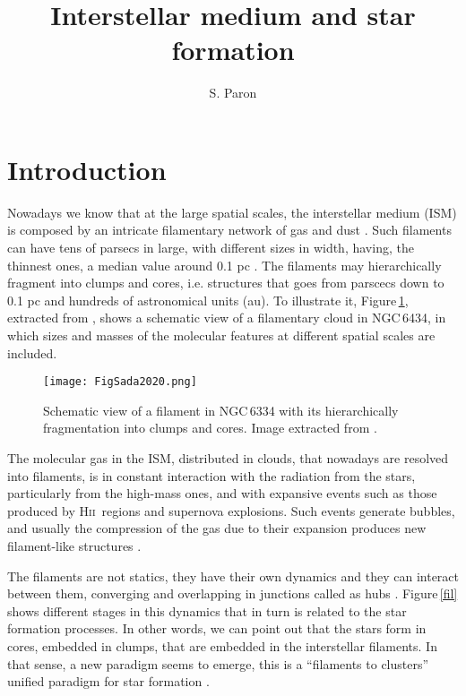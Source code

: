 \documentclass[baaa]{baaa}
\title{Interstellar medium and star formation}
\author{S. Paron\inst{1}
}
\institute{
Instituto de Astronomía y Física del Espacio, CONICET--UBA, Argentina
}
\newcommand{\hii}{H\textsc{ii}}
\begin{document}
\maketitle

\section{Introduction}

Nowadays we know that at the large spatial scales, the interstellar medium (ISM) is composed by an intricate filamentary network of gas and dust \citep{andre14,pineda23}. Such filaments can have tens of parsecs in large, with different sizes in width, having, the thinnest ones, a median value around 0.1 pc \citep{arzou19}. The filaments may hierarchically fragment into clumps and cores, i.e. structures that goes from parscecs down to 0.1 pc and hundreds of astronomical units (au). To illustrate it, Figure\,\ref{hier}, extracted from \citet{sada20}, shows a schematic view of a filamentary cloud in NGC\,6434, in which sizes and masses of the molecular features at different spatial scales are included.  

\begin{figure}[h!]
\centering
\texttt{[image: FigSada2020.png]}
\caption{Schematic view of a filament in NGC\,6334 with its hierarchically fragmentation into clumps and cores. Image extracted from \citet{sada20}. }
\label{hier}
\end{figure}


The molecular gas in the ISM, distributed in clouds, that nowadays are resolved into filaments, is in constant interaction with the radiation from the stars, particularly from the high-mass ones, and with expansive events such as those produced by \hii~regions and supernova explosions. Such events generate bubbles, and usually the compression of the gas due to their expansion produces new filament-like structures \citep{pineda23}. 

The filaments are not statics, they have their own dynamics and they can interact between them, converging and overlapping in junctions called as hubs \citep{kumar20}. Figure\,\ref{fil} shows different stages in this dynamics that in turn is related to the star formation processes. In other words, we can point out that the stars form in cores, embedded in clumps, that are embedded in the interstellar filaments. In that sense, a new paradigm seems to emerge, this is a ``filaments to clusters'' unified paradigm for star formation \citep{kumar20}. 
\end{document}
